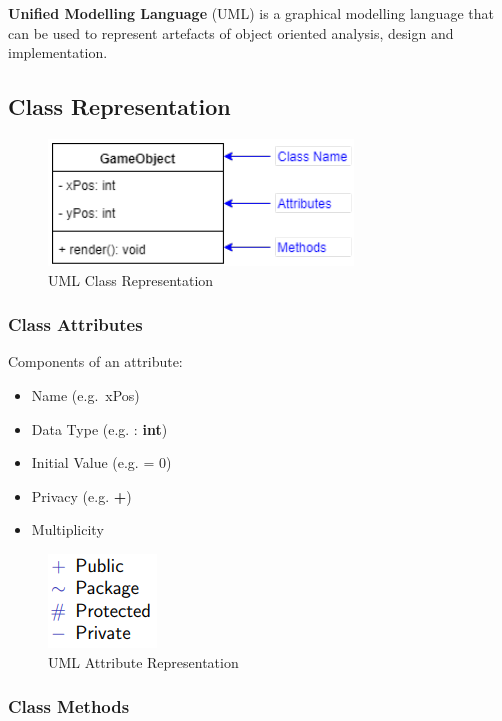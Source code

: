 \documentclass[]{article}
\providecommand{\tightlist}{%
  \setlength{\itemsep}{0pt}\setlength{\parskip}{0pt}}
\begin{document}
\textbf{Unified Modelling Language} (UML) is a graphical modelling
language that can be used to represent artefacts of object oriented
analysis, design and implementation.

\hypertarget{class-representation}{%
\subsection{Class Representation}\label{class-representation}}

\begin{figure}
\centering
\includegraphics{images/uml1.png}
\caption{UML Class Representation}
\end{figure}

\hypertarget{class-attributes}{%
\subsubsection{Class Attributes}\label{class-attributes}}

Components of an attribute:

\begin{itemize}
\tightlist
\item
  Name (e.g.~xPos)
\item
  Data Type (e.g. : \textbf{int})
\item
  Initial Value (e.g. = 0)
\item
  Privacy (e.g. \textbf{+})
\item
  Multiplicity
\end{itemize}

\begin{figure}
\centering
\includegraphics{images/uml2.png}
\caption{UML Attribute Representation}
\end{figure}

\hypertarget{class-methods}{%
\subsubsection{Class Methods}\label{class-methods}}
\end{document}
